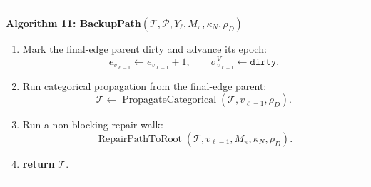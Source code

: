 \documentclass[11pt]{article}
\newcommand{\Tree}{\mathcal{T}}
\newcommand{\Path}{\mathcal{P}}
\newcommand{\RepairPathToRoot}{\operatorname{RepairPathToRoot}}
\newcommand{\PropagateCategorical}{\operatorname{PropagateCategorical}}
\newenvironment{algorithmblock}[1]
{
  \par\medskip
  \noindent\hrule\par\smallskip
  \noindent\textbf{#1}
  \par\smallskip
}
{
  \par\smallskip\noindent\hrule\par\medskip
}
\newcommand{\Return}{\textbf{return }}
\begin{document}
\begin{algorithmblock}{Algorithm 11: BackupPath\((\Tree,\Path,Y_\ell,M_\pi,\kappa_N,\rho_D)\)}
\begin{enumerate}[leftmargin=2em]
  \item Mark the final-edge parent dirty and advance its epoch:
  \[
  e_{v_{\ell-1}}\gets e_{v_{\ell-1}}+1,
  \qquad
  \sigma^V_{v_{\ell-1}}\gets\texttt{dirty}.
  \]

  \item Run categorical propagation from the final-edge parent:
  \[
  \Tree\gets\PropagateCategorical(\Tree,v_{\ell-1},\rho_D).
  \]

  \item Run a non-blocking repair walk:
  \[
  \RepairPathToRoot(\Tree,v_{\ell-1},M_\pi,\kappa_N,\rho_D).
  \]

  \item \Return \(\Tree\).
\end{enumerate}

\end{algorithmblock}
\end{document}

